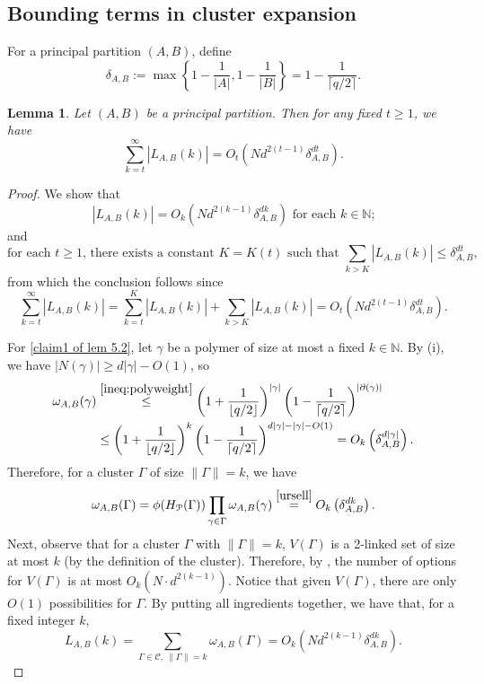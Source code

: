 \documentclass{amsart}
\newtheorem{lem}[thm]{Lemma}
\theoremstyle{definition}
\newcommand{\bO}{O}
\newcommand{\we}{\omega}
\newcommand{\NN}{\mathbb{N}}
\newcommand{\cP}{\mathcal{P} }
\newcommand{\beq}[1]{\begin{equation}\label{#1}}
\newcommand{\enq}[0]{\end{equation}}
\newcommand{\nin}[0]{\noindent}
\newcommand{\0}[0]{\emptyset}
\begin{document}
\subsection{Bounding terms in cluster expansion} For a principal partition $(A, B)$, define
\[
\delta_{A, B}:=\max\left\{1 - \frac{1}{|A|}, 1 - \frac{1}{|B|}\right\}=1 - \frac{1}{\lceil q/2 \rceil}.
\]

\begin{lem}\label{lem:erroresti}
Let $(A, B)$ be a principal partition. Then for any fixed $t\geq 1$, we have 
\[
\sum_{k=t}^{\infty}|L_{A, B}(k)|=\bO_t\left(Nd^{2(t-1)}\delta_{A, B}^{dt}\right).
\]
\end{lem}
\begin{proof}
We show that
\beq{claim1 of lem 5.2}
|L_{A, B}(k)|=\bO_k\left(Nd^{2(k-1)}\delta_{A, B}^{dk}\right) \mbox{ for each $k\in\NN$;}
\enq
and
\beq{claim2 of lem 5.2}
\mbox{for each $t\geq 1$, there exists a constant $K=K(t)$ such that 
$\sum_{k>K}|L_{A, B}(k)|\le \delta_{A, B}^{dt}$,}
\enq
from which the conclusion follows since
\[
\sum_{k=t}^{\infty}|L_{A, B}(k)|=\sum_{k=t}^{K}|L_{A, B}(k)| +\sum_{k>K}|L_{A, B}(k)|=
\bO_t\left(Nd^{2(t-1)}\delta_{A, B}^{dt}\right).
\]

\nin For \eqref{claim1 of lem 5.2}, let $\gamma$ be a polymer of size at most a fixed $k\in\NN$. By  (i), we have $|N(\gamma)|\geq d|\gamma| - \bO(1)$, so
\[
\begin{split}
\we_{A,B}(\gamma)&\stackrel{\eqref{ineq:polyweight}}{\leq} \left(1 + \frac{1}{\lfloor q/2 \rfloor}\right)^{|\gamma|}\left(1 - \frac{1}{\lceil q/2 \rceil}\right)^{|\partial(\gamma)|}\\
&\leq\left(1 + \frac{1}{\lfloor q/2 \rfloor}\right)^{k}\left(1 - \frac{1}{\lceil q/2 \rceil}\right)^{d|\gamma|- |\gamma|-\bO(1)}=\bO_k\left(\delta_{A, B}^{d|\gamma|}\right).\\
\end{split}
\]
Therefore, for a cluster $\Gamma$ of size $\lVert \Gamma\rVert=k$, we have
\begin{equation}\label{eq:clutribound}
\we_{A,B}(\Gamma)=\phi(H_{\cP}(\Gamma))\prod_{\gamma\in \Gamma}\we_{A,B}(\gamma)\stackrel{\eqref{ursell}}{=}\bO_k\left(\delta_{A, B}^{dk}\right).
\end{equation}
Next, observe that for a cluster $\Gamma$ with $\lVert \Gamma\rVert=k$, $V(\Gamma)$ is a 2-linked set of size at most $k$ (by the definition of the cluster). Therefore, by , the number of options for $V(\Gamma)$ is at most $\bO_k\left(N\cdot d^{2(k-1)}\right)$.
Notice that given $V(\Gamma)$, there are only $\bO(1)$ possibilities for $\Gamma$.
By putting all ingredients together, we have that, for a fixed integer $k$, 
\begin{equation}\label{ineq:fixk}
L_{A, B}(k)=\sum_{\Gamma\in \mathcal{C},\  \lVert \Gamma\rVert=k}\we_{A,B}(\Gamma) = \bO_k\left(N d^{2(k-1)}\delta_{A, B}^{dk}\right).
\end{equation}


\end{proof}
\end{document}
